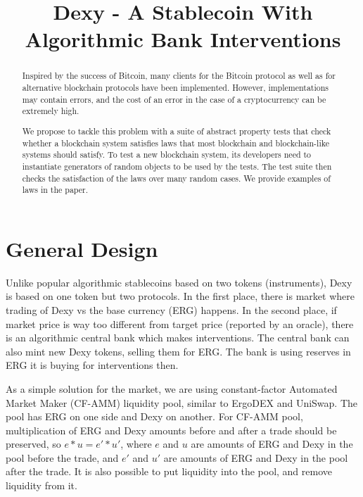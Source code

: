 \documentclass[conference]{IEEEtran}   %
\newcommand{\bc}{ERG}
\newcommand{\dx}{Dexy}
\begin{document}
\title{Dexy - A Stablecoin With Algorithmic Bank Interventions}
\author{
}

\maketitle

\begin{abstract}
Inspired by the success of Bitcoin, many clients for the Bitcoin protocol as well as for alternative blockchain protocols have been implemented. However, implementations may contain errors, and the cost of an error in the case of a cryptocurrency can be extremely high. 

We propose to tackle this problem with a suite of abstract property tests that check whether a blockchain system satisfies laws that most blockchain and blockchain-like systems should satisfy. To test a new blockchain system, its developers need to instantiate generators of random objects to be used by the tests. The test suite then checks the satisfaction of the laws over many random cases. We provide examples of laws in the paper.
\end{abstract}



\section{General Design}

Unlike popular algorithmic stablecoins based on two tokens (instruments), \dx{} is based on one token but two protocols. In the first place, 
there is market where trading of \dx{} vs the base currency (\bc{}) happens. In the second place, if market price is way too different from target price (reported by an oracle), there is an algorithmic central bank which makes interventions. The central bank can also mint new \dx{} tokens, selling them for \bc{}. The bank is using reserves in \bc{} it is buying for interventions then. 

As a simple solution for the market, we are using constant-factor Automated Market Maker (CF-AMM) liquidity pool, similar to ErgoDEX and UniSwap. The pool has \bc{} on one side and \dx{} on another. For CF-AMM pool, multiplication of \bc{} and \dx{} amounts before and after a trade should be preserved, so $e * u = e' * u'$, where $e$ and $u$ are amounts of \bc{} and \dx{} in the pool before the trade, and $e'$ and $u'$ are amounts of \bc{} and \dx{} in the pool after the trade. It is also possible to put liquidity into the pool, and remove liquidity from it. 
\end{document}
